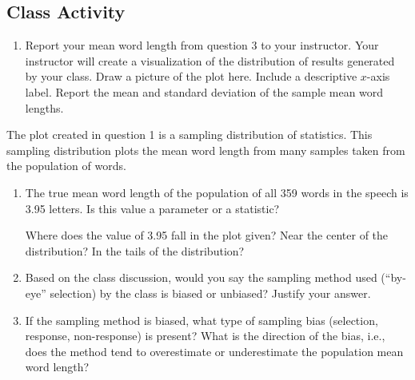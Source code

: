 \documentclass[
]{report}
\providecommand{\tightlist}{%
  \setlength{\itemsep}{0pt}\setlength{\parskip}{0pt}}
\begin{document}
\vspace{5in}

\subsection{Class Activity}\label{class-activity}

\begin{enumerate}
\def\labelenumi{\arabic{enumi}.}
\tightlist
\item
  Report your mean word length from question 3 to your instructor. Your instructor will create a visualization of the distribution of results generated by your class. Draw a picture of the plot here. Include a descriptive \(x\)-axis label. Report the mean and standard deviation of the sample mean word lengths.
\end{enumerate}

\vspace{2in}

\newpage

The plot created in question 1 is a sampling distribution of statistics. This sampling distribution plots the mean word length from many samples taken from the population of words.

\begin{enumerate}
\def\labelenumi{\arabic{enumi}.}
\setcounter{enumi}{1}
\item
  The true mean word length of the population of all 359 words in the speech is 3.95 letters. Is this value a parameter or a statistic?\\
  \vspace{0.2in}

  Where does the value of 3.95 fall in the plot given? Near the center of the distribution? In the tails of the distribution?
  \vspace{0.3in}
\item
  Based on the class discussion, would you say the sampling method used (``by-eye'' selection) by the class is biased or unbiased? Justify your answer.\\
  \vspace{0.5in}
\item
  If the sampling method is biased, what type of sampling bias (selection, response, non-response) is present? What is the direction of the bias, i.e., does the method tend to overestimate or underestimate the population mean word length?
  \vspace{0.5in}
\end{enumerate}
\end{document}
